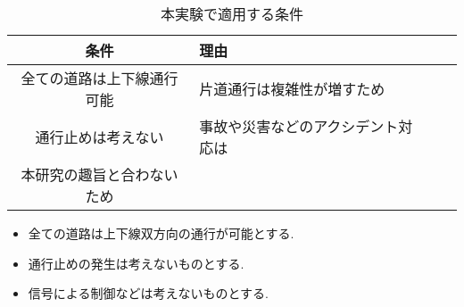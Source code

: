\begin{table}[h]
  \caption{本実験で適用する条件}
  \label{table:SpeedOfLight}
  \centering
  \begin{tabular}{clll}
    \hline
      条件 & 理由 \\
      \hline \hline
      全ての道路は上下線通行可能 & 片道通行は複雑性が増すため  \\
      通行止めは考えない & 事故や災害などのアクシデント対応は \\ 本研究の趣旨と合わないため \\
    \hline
  \end{tabular}
\end{table}



\begin{itemize}
  \item 全ての道路は上下線双方向の通行が可能とする.
  \item 通行止めの発生は考えないものとする.
  \item 信号による制御などは考えないものとする.
\end{itemize}


